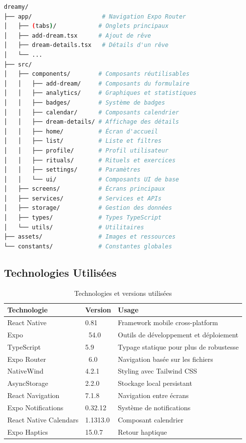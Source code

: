 \documentclass[12pt,a4paper]{article}
\begin{document}
\begin{lstlisting}[language=bash, caption=Structure du projet]
dreamy/
├── app/                    # Navigation Expo Router
│   ├── (tabs)/            # Onglets principaux
│   ├── add-dream.tsx      # Ajout de rêve
│   ├── dream-details.tsx   # Détails d'un rêve
│   └── ...
├── src/
│   ├── components/        # Composants réutilisables
│   │   ├── add-dream/     # Composants du formulaire
│   │   ├── analytics/     # Graphiques et statistiques
│   │   ├── badges/        # Système de badges
│   │   ├── calendar/      # Composants calendrier
│   │   ├── dream-details/ # Affichage des détails
│   │   ├── home/          # Écran d'accueil
│   │   ├── list/          # Liste et filtres
│   │   ├── profile/       # Profil utilisateur
│   │   ├── rituals/       # Rituels et exercices
│   │   ├── settings/      # Paramètres
│   │   └── ui/            # Composants UI de base
│   ├── screens/           # Écrans principaux
│   ├── services/          # Services et APIs
│   ├── storage/           # Gestion des données
│   ├── types/             # Types TypeScript
│   └── utils/             # Utilitaires
├── assets/                # Images et ressources
└── constants/             # Constantes globales
\end{lstlisting}

\subsection{Technologies Utilisées}

\begin{table}[H]
\centering
\begin{tabular}{|l|l|l|}
\hline
\textbf{Technologie} & \textbf{Version} & \textbf{Usage} \\
\hline
React Native & 0.81 & Framework mobile cross-platform \\
Expo & ~54.0 & Outils de développement et déploiement \\
TypeScript & 5.9 & Typage statique pour plus de robustesse \\
Expo Router & ~6.0 & Navigation basée sur les fichiers \\
NativeWind & 4.2.1 & Styling avec Tailwind CSS \\
AsyncStorage & 2.2.0 & Stockage local persistant \\
React Navigation & 7.1.8 & Navigation entre écrans \\
Expo Notifications & 0.32.12 & Système de notifications \\
React Native Calendars & 1.1313.0 & Composant calendrier \\
Expo Haptics & 15.0.7 & Retour haptique \\
\hline
\end{tabular}
\caption{Technologies et versions utilisées}
\end{table}
\end{document}
